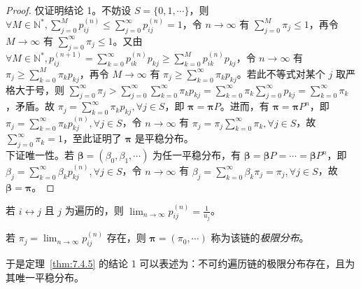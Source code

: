 \documentclass[../main.tex]{subfiles}
\begin{document}
\begin{proof}
    仅证明结论 1。不妨设 $S=\{0,1,\cdots\}$，则 $\forall M\in\mathbb N^*,\sum_{j=0}^Mp_{ij}^{(n)}\leq\sum_{j=0}^\infty p_{ij}^{(n)}=1$，令 $n\rightarrow\infty$ 有 $\sum_{j=0}^M\pi_j\leq1$，再令 $M\rightarrow\infty$ 有 $\sum_{j=0}^\infty\pi_j\leq1$。又由 $\forall M\in\mathbb N^*,p_{ij}^{(n+1)}=\sum_{k=0}^\infty p_{ik}^{(n)}p_{kj}\geq\sum_{k=0}^Mp_{ik}^{(n)}p_{kj}$，令 $n\rightarrow\infty$ 有 $\pi_j\geq\sum_{k=0}^M\pi_kp_{kj}$，再令 $M\rightarrow\infty$ 有 $\pi_j\geq\sum_{k=0}^\infty\pi_kp_{kj}$。若此不等式对某个 $j$ 取严格大于号，则 $\sum_{j=0}^\infty\pi_j>\sum_{j=0}^\infty\sum_{k=0}^\infty\pi_kp_{kj}=\sum_{k=0}^\infty\pi_k\sum_{j=0}^\infty p_{kj}=\sum_{k=0}^\infty\pi_k$，矛盾。故 $\pi_j=\sum_{k=0}^\infty\pi_kp_{kj},\forall j\in S$，即 $\boldsymbol\pi=\boldsymbol\pi P$。进而，有 $\boldsymbol\pi=\boldsymbol\pi P^n$，即 $\pi_j=\sum_{k=0}^\infty\pi_kp_{kj}^{(n)},\forall j\in S$，令 $n\rightarrow\infty$ 有 $\pi_j=\pi_j\sum_{k=0}^\infty\pi_k,\forall j\in S$，故 $\sum_{j=0}^\infty\pi_k=1$，至此证明了 $\boldsymbol\pi$ 是平稳分布。\\
    下证唯一性。若 $\boldsymbol\beta=(\beta_0,\beta_1,\cdots)$ 为任一平稳分布，有 $\boldsymbol\beta=\boldsymbol\beta P=\cdots=\boldsymbol\beta P^n$，即 $\beta_j=\sum_{k=0}^\infty\beta_kp_{kj}^{(n)},\forall j\in S$，令 $n\rightarrow\infty$ 有 $\beta_j=\sum_{k=0}^\infty\beta_k\pi_j=\pi_j,\forall j\in S$，故 $\boldsymbol\beta=\boldsymbol\pi$。
\end{proof}

\begin{proposition}
    若 $i\leftrightarrow j$ 且 $j$ 为遍历的，则 $\lim_{n\rightarrow\infty}p_{ij}^{(n)}=\frac1{u_j}$。
\end{proposition}


\begin{definition}\label{def:7.4.4}
    若 $\pi_j=\lim_{n\rightarrow\infty}p_{ij}^{(n)}$ 存在，则 $\boldsymbol\pi=(\pi_0,\cdots)$ 称为该链的\emph{极限分布}。
\end{definition}

于是定理~\ref{thm:7.4.5} 的结论 1 可以表述为：不可约遍历链的极限分布存在，且为其唯一平稳分布。
\end{document}

